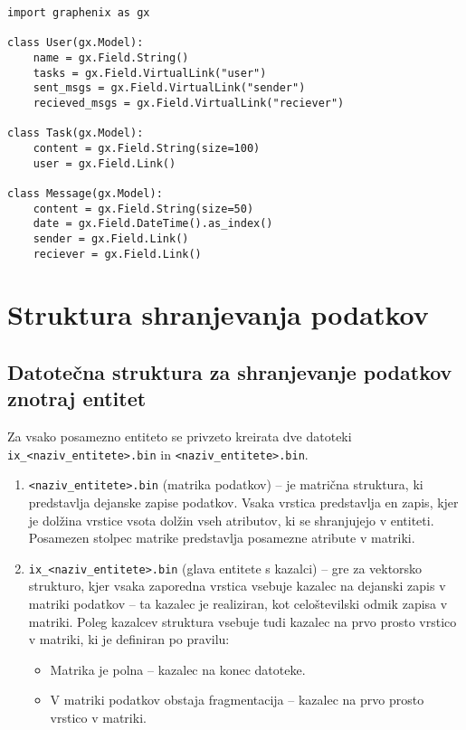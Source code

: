 \documentclass[a4paper,12pt,openright]{book}
\begin{document}
\newpage
\begin{verbatim}
import graphenix as gx

class User(gx.Model):
    name = gx.Field.String()
    tasks = gx.Field.VirtualLink("user")
    sent_msgs = gx.Field.VirtualLink("sender")
    recieved_msgs = gx.Field.VirtualLink("reciever")

class Task(gx.Model):
    content = gx.Field.String(size=100)
    user = gx.Field.Link()

class Message(gx.Model):
    content = gx.Field.String(size=50)
    date = gx.Field.DateTime().as_index()
    sender = gx.Field.Link()
    reciever = gx.Field.Link()
\end{verbatim}
    
    \section{Struktura shranjevanja podatkov}
        \subsection{Datotečna struktura za shranjevanje podatkov znotraj entitet}
        Za vsako posamezno entiteto se privzeto kreirata dve datoteki {\tt ix\_<naziv\_entitete>.bin} in {\tt <naziv\_entitete>.bin}.
        \begin{enumerate}
            \item {\tt <naziv\_entitete>.bin} (matrika podatkov) – je matrična struktura, ki predstavlja dejanske zapise podatkov. Vsaka vrstica predstavlja en zapis, kjer je dolžina vrstice vsota dolžin vseh atributov, ki se shranjujejo v entiteti. Posamezen stolpec matrike predstavlja posamezne atribute v matriki.
            \item {\tt ix\_<naziv\_entitete>.bin} (glava entitete s kazalci) – gre za vektorsko strukturo, kjer vsaka zaporedna vrstica vsebuje kazalec na dejanski zapis v matriki podatkov – ta kazalec je realiziran, kot celoštevilski odmik zapisa v matriki. Poleg kazalcev struktura vsebuje tudi kazalec na prvo prosto vrstico v matriki, ki je definiran po pravilu:
            \begin{itemize}
                \item Matrika je polna – kazalec na konec datoteke.
                \item V matriki podatkov obstaja fragmentacija – kazalec na prvo prosto vrstico v matriki.
            \end{itemize}
        \end{enumerate}
\end{document}
